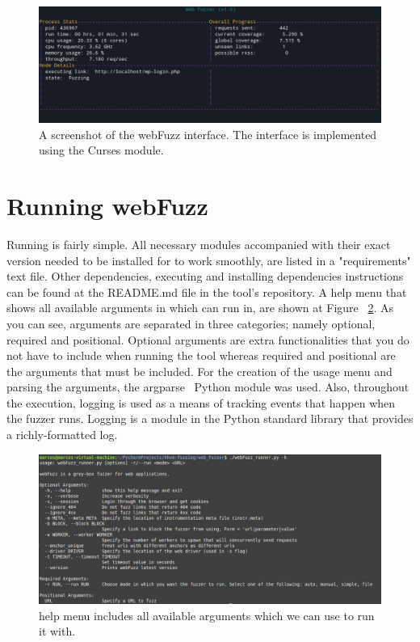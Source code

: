 \begin{figure}[ht]
 \centering
 \captionsetup{justification=centering}
 \includegraphics[width=4.6in]{figures/curses.png}
 \caption{A screenshot of the webFuzz interface. The interface is implemented using the Curses module.}
 \label{fig:curses_interface}
\end{figure}


\section{Running webFuzz}
Running \pname{} is fairly simple. All necessary modules accompanied with their exact version needed to be installed for \pname{} to work smoothly, are listed in a "requirements" text file. Other dependencies, executing and installing dependencies instructions can be found at the README.md file in the tool's repository. A help menu that shows all available arguments in which \pname{} can run in, are shown at Figure ~\ref{fig:argparser_menu}. As you can see, arguments are separated in three categories; namely optional, required and positional. Optional arguments are extra functionalities that you do not have to include when running the tool whereas required and positional are the arguments that must be included. For the creation of the usage menu and parsing the arguments, the argparse~\cite{argparse} Python module was used.
Also, throughout the execution, logging is used as a means of tracking events that happen when the fuzzer runs. Logging is a module in the Python standard library that provides a richly-formatted log.

\begin{figure}[ht]
 \centering
 \captionsetup{justification=centering}
 \includegraphics[width=4.6in]{figures/argparser_menu.jpg}
 \caption{\pname{} help menu includes all available arguments which we can use to run it with.}
 \label{fig:argparser_menu}
\end{figure}
